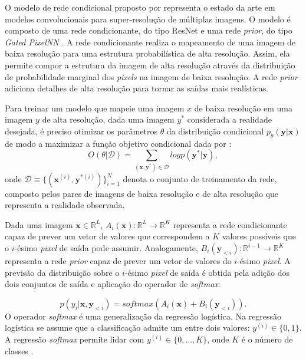 O modelo de rede condicional proposto por \cite{DahlNS17} representa o estado da arte em modelos convolucionais para
super-resolução de múltiplas imagens. O modelo é composto de uma rede condicionante, do tipo ResNet \citep{He2016}
e uma rede \textit{prior}, do tipo \textit{Gated PixelNN} \citep{Oord16}.
A rede condicionante realiza o mapeamento de uma imagem de baixa resolução para uma estrutura probabilística
de alta resolução. Assim, ela permite compor a estrutura da imagem de alta resolução através da distribuição
de probabilidade marginal dos \textit{pixels} na imagem de baixa resolução. A rede \textit{prior} adiciona detalhes de alta resolução
para tornar as saídas mais realísticas. 

Para treinar um modelo que mapeie uma imagem $x$ de baixa resolução em uma imagem $y$ de alta resolução,
dada uma imagem $y^*$ considerada a realidade desejada, é preciso otimizar os parâmetros
$\theta$ da distribuição condicional $p_{\theta}(\boldsymbol{y}|\boldsymbol{x})$ de modo
a maximizar a função objetivo condicional dada por \citep{DahlNS17}:
\begin{equation}
\label{eqn:objfunc}
O(\theta|\mathcal{D})= \sum_{(\boldsymbol{x},\boldsymbol{y^*})\in \mathcal{D}} log p(\boldsymbol{y^*}|\boldsymbol{y}),
\end{equation}
onde $\mathcal{D} \equiv \{(\boldsymbol{x}^{(i)},\boldsymbol{y}^{*(i)})\}_{i=1}^N$ denota o conjunto
de treinamento da rede, composto pelos pares de imagens de baixa resolução e de alta resolução que representa
a realidade observada.

Dada uma imagem $ \boldsymbol{x} \in \mathbb{R}^L $, $A_i(\boldsymbol{x}) : \mathbb{R}^L \rightarrow \mathbb{R}^K$
representa a rede condicionante capaz de prever um vetor de valores que correspondem a $K$ valores
possíveis que o $i$-ésimo \textit{pixel} de saída pode assumir. Analogamente,
$B_i(\boldsymbol{y}_{<i}) : \mathbb{R}^{i-1} \rightarrow \mathbb{R}^K$ representa a rede \textit{prior}
capaz de prever um vetor de valores do $i$-ésimo \textit{pixel}. A previsão da distribuição
sobre o $i$-ésimo \textit{pixel} de saída é obtida pela adição dos dois conjuntos de saída e aplicação
do operador de \textit{softmax}:

\begin{equation}
\label{eqn:cnnpred}
p(y_i|\boldsymbol{x},\boldsymbol{y}_{<i}) = softmax(A_i(\boldsymbol{x}) + B_i(\boldsymbol{y}_{<i})).
\end{equation}
O operador \textit{softmax} é uma generalização da regressão logística. Na regressão logística se assume que a classificação 
admite um entre dois valores: $y^{(i)} \in \{ 0,1\}$. A regressão \textit{softmax} permite lidar com
$y^{(i)} \in \{ 0,...,K\}$, onde $K$  é o número de classes \citep{Nielson15}.

